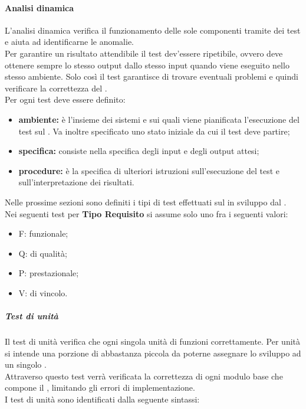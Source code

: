 	\paragraph{Analisi dinamica}
	\label{sec:3.2.1.3}
		L'analisi dinamica verifica il funzionamento delle sole componenti  tramite dei test e aiuta ad identificarne le anomalie. \\
		Per garantire un risultato attendibile il test dev'essere ripetibile, ovvero deve ottenere sempre lo stesso output dallo stesso input quando viene eseguito nello stesso ambiente. Solo così il test garantisce di trovare eventuali problemi e quindi verificare la correttezza del  . \\
		Per ogni test deve essere definito:
		\begin{itemize}
			\item \textbf{ambiente:} è l'insieme dei sistemi  e  sui quali viene pianificata l'esecuzione del test sul . Va inoltre specificato uno stato iniziale da cui il test deve partire;
			\item \textbf{specifica:} consiste nella specifica degli input e degli output attesi;
			\item \textbf{procedure:} è la specifica di ulteriori istruzioni sull'esecuzione del test e sull'interpretazione dei risultati.
		\end{itemize}
		Nelle prossime sezioni sono definiti i tipi di test effettuati sul   in sviluppo dal .\\
		Nei seguenti test per \textbf{Tipo Requisito} si assume solo uno fra i seguenti valori:
		\begin{itemize}
			\item F: funzionale;
			\item Q: di qualità;
			\item P: prestazionale;
			\item V: di vincolo.
		\end{itemize}
		\subparagraph{Test di unità}
		\label{sec:3.2.1.3.1}
			Il test di unità verifica che ogni singola unità di  funzioni correttamente. Per unità si intende una porzione di  abbastanza piccola da poterne assegnare lo sviluppo ad un singolo \PR. \\
			Attraverso questo test verrà verificata la correttezza di ogni modulo base che compone il , limitando gli errori di implementazione. \\
			I test di unità sono identificati dalla seguente sintassi:
